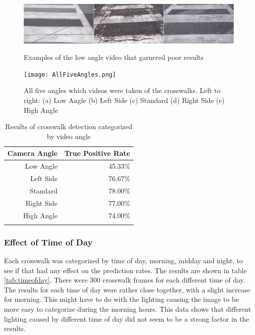 \documentclass[12pt]{ucthesis}
\newcommand{\captionfonts}{\small\bf\ssp}
\begin{document}
\begin{figure}[t]
\begin{center}
\includegraphics[width=15cm]{DownBad.png}
\captionfonts
\caption[Low Angle Video Examples]{Examples of the low angle video that garnered poor results}
\label{fig:downBadPic}
\end{center}
\end{figure}

\begin{figure}[t]
\begin{center}
\texttt{[image: AllFiveAngles.png]}
\captionfonts
\caption[All Five Different Crosswalk Angles]{All five angles which videos were taken of the crosswalks. Left to right: (a) Low Angle (b) Left Side (c) Standard (d) Right Side (e) High Angle}
\label{fig:AllFiveAngles}
\end{center}
\end{figure}

\begin{table}[t]
    \begin{longtable}{|r|r|}
    \hline
    Camera Angle & True Positive Rate \bigstrut\\
    \hline
    Low Angle & 45.33\% \bigstrut\\
    \hline
    Left Side & 76.67\% \bigstrut\\
    \hline
    Standard & 78.00\% \bigstrut\\
    \hline
    Right Side & 77.00\% \bigstrut\\
    \hline
    High Angle & 74.00\% \bigstrut\\
    \hline


    \caption{Results of crosswalk detection categorized by video angle}
    \label{tab:downbad} 
    \end{longtable}
\end{table}

\subsubsection{Effect of Time of Day}
Each crosswalk was categorized by time of day, morning, midday and night, to see if that had any effect on the prediction rates. The results are shown in table \ref{tab:timeofday}. There were 300 crosswalk frames for each different time of day. The results for each time of day were rather close together, with a slight increase for morning. This might have to do with the lighting causing the image to be more easy to categorize during the morning hours. This data shows that different lighting caused by different time of day did not seem to be a strong factor in the results.
\end{document}
